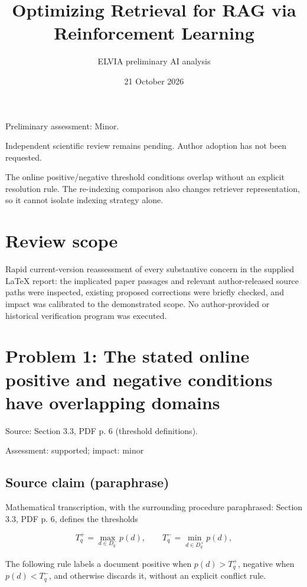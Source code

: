 \documentclass[11pt]{article}
\begin{document}
\title{Optimizing Retrieval for RAG via Reinforcement Learning}

\author{ELVIA preliminary AI analysis}\date{21 October 2026}\maketitle

Preliminary assessment: Minor.\par

Independent scientific review remains pending. Author adoption has not been requested.

The online positive/negative threshold conditions overlap without an explicit resolution rule. The re-indexing comparison also changes retriever representation, so it cannot isolate indexing strategy alone.

\section*{Review scope}

Rapid current-version reassessment of every substantive concern in the supplied LaTeX report: the implicated paper passages and relevant author-released source paths were inspected, existing proposed corrections were briefly checked, and impact was calibrated to the demonstrated scope. No author-provided or historical verification program was executed.

\section*{Problem 1: The stated online positive and negative conditions have overlapping domains}

Source: Section 3.3, PDF p. 6 (threshold definitions).

Assessment: supported; impact: minor

\subsection*{Source claim (paraphrase)}

Mathematical transcription, with the surrounding procedure paraphrased: Section 3.3, PDF p. 6, defines the thresholds

\[T_q^+=\max_{d\in D_q^-}p(d),\qquad T_q^-=\min_{d\in D_q^+}p(d),\]

The following rule labels a document positive when \(p(d)>T_q^+\), negative when \(p(d)<T_q^-\), and otherwise discards it, without an explicit conflict rule.
\end{document}
